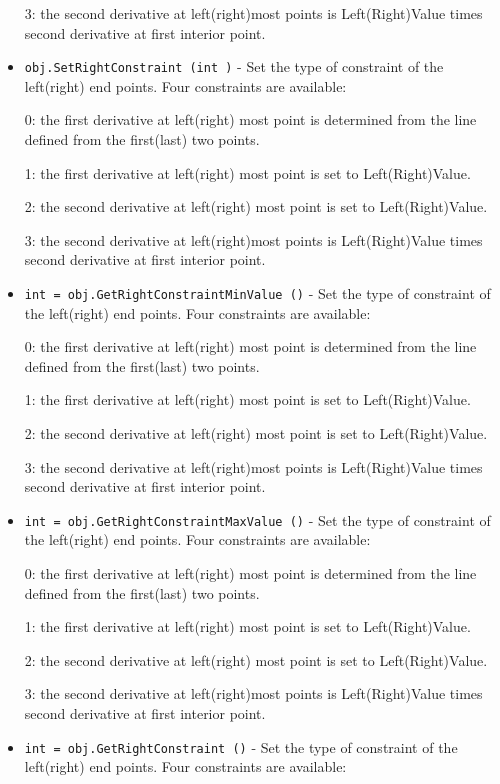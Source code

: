 \begin{itemize}
 3: the second derivative at left(right)most points is Left(Right)Value
 times second derivative at first interior point.

\item  \verb|obj.SetRightConstraint (int )| -  Set the type of constraint of the left(right) end points. Four
 constraints are available:
 
 0: the first derivative at left(right) most point is determined
 from the line defined from the first(last) two points.

 1: the first derivative at left(right) most point is set to
 Left(Right)Value.
 
 2: the second derivative at left(right) most point is set to
 Left(Right)Value.
 
 3: the second derivative at left(right)most points is Left(Right)Value
 times second derivative at first interior point.

\item  \verb|int = obj.GetRightConstraintMinValue ()| -  Set the type of constraint of the left(right) end points. Four
 constraints are available:
 
 0: the first derivative at left(right) most point is determined
 from the line defined from the first(last) two points.

 1: the first derivative at left(right) most point is set to
 Left(Right)Value.
 
 2: the second derivative at left(right) most point is set to
 Left(Right)Value.
 
 3: the second derivative at left(right)most points is Left(Right)Value
 times second derivative at first interior point.

\item  \verb|int = obj.GetRightConstraintMaxValue ()| -  Set the type of constraint of the left(right) end points. Four
 constraints are available:
 
 0: the first derivative at left(right) most point is determined
 from the line defined from the first(last) two points.

 1: the first derivative at left(right) most point is set to
 Left(Right)Value.
 
 2: the second derivative at left(right) most point is set to
 Left(Right)Value.
 
 3: the second derivative at left(right)most points is Left(Right)Value
 times second derivative at first interior point.

\item  \verb|int = obj.GetRightConstraint ()| -  Set the type of constraint of the left(right) end points. Four
 constraints are available:
 

\end{itemize}
